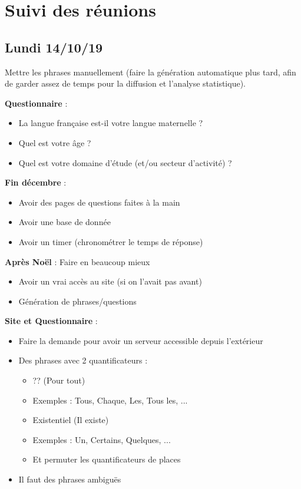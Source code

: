 \documentclass[11pt,letterpaper]{article}
\begin{document}
\section{Suivi des réunions}

\subsection{Lundi 14/10/19}
Mettre les phrases manuellement (faire la génération automatique plus
tard, afin de garder assez de temps pour la diffusion et l'analyse statistique). \vspace{5mm}
    
\textbf{Questionnaire} :
\begin{itemize}
    \item La langue française est-il votre langue maternelle ?
    \item Quel est votre âge ?
    \item Quel est votre domaine d'étude (et/ou secteur d'activité) ?
\end{itemize} \vspace{5mm}

\textbf{Fin décembre} :
\begin{itemize}
    \item Avoir des pages de questions faites à la main
    \item Avoir une base de donnée
    \item Avoir un timer (chronométrer le temps de réponse)
\end{itemize} \vspace{5mm}
    
\textbf{Après Noël} : Faire en beaucoup mieux
\begin{itemize}
    \item Avoir un vrai accès au site (si on l'avait pas avant)
    \item Génération de phrases/questions
\end{itemize} \vspace{5mm}
    
\textbf{Site et Questionnaire} :
\begin{itemize}
    \item Faire la demande pour avoir un serveur accessible depuis l'extérieur
        
    \item Des phrases avec 2 quantificateurs :
    \begin{itemize}
        \item ?? (Pour tout)
        \item Exemples : Tous, Chaque, Les, Tous les, ...
        \item Existentiel (Il existe)
        \item Exemples : Un, Certains, Quelques, ...
        \item Et permuter les quantificateurs de places
    \end{itemize}
    \item Il faut des phrases ambiguës
\end{itemize} \vspace{5mm}
\end{document}
